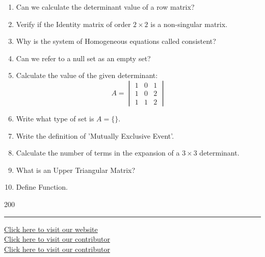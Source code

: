 \documentclass[11pt,a4paper]{article}
\begin{document}
\begin{enumerate}[label=\arabic*.,leftmargin=*,itemsep=6pt]
  \item Can we calculate the determinant value of a row matrix?
  \item Verify if the Identity matrix of order $2 \times 2$ is a non-singular matrix.
  \item Why is the system of Homogeneous equations called consistent?
  \item Can we refer to a null set as an empty set?
  \item Calculate the value of the given determinant:
  \[
  A = \begin{vmatrix}
    1 & 0 & 1 \\
    1 & 0 & 2 \\
    1 & 1 & 2
  \end{vmatrix}
  \]
  \item Write what type of set is $A = \{\}$.
  \item Write the definition of 'Mutually Exclusive Event'.
  \item Calculate the number of terms in the expansion of a $3 \times 3$ determinant.
  \item What is an Upper Triangular Matrix?
  \item Define Function.
\end{enumerate}
200

\vfill
\rule{\linewidth}{0.4pt}
\begin{center}\small
\href{https://bhu-exam.vercel.app/}{Click here to visit our website}\\[4pt]\href{https://me-aryan.vercel.app/}{Click here to visit our contributor}\\[4pt]\href{https://quashan-me.vercel.app/}{Click here to visit our contributor}
\end{center}
\end{document}
